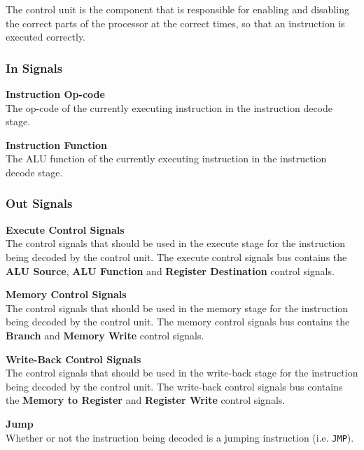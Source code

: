 The control unit is the component that is responsible for enabling and disabling the correct parts of the processor at the correct times, so that an instruction is executed correctly.

\subsubsection{In Signals}

\begin{description}
\item{\textbf{Instruction Op-code}} \\
    The op-code of the currently executing instruction in the instruction decode stage.

\item{\textbf{Instruction Function}} \\
    The ALU function of the currently executing instruction in the instruction decode stage. 
\end{description}

\subsubsection{Out Signals}

\begin{description}
\item{\textbf{Execute Control Signals}} \\
    The control signals that should be used in the execute stage for the instruction being decoded by the control unit.
    The execute control signals bus contains the \textbf{ALU Source}, \textbf{ALU Function} and \textbf{Register Destination} control signals.

\item{\textbf{Memory Control Signals}} \\
    The control signals that should be used in the memory stage for the instruction being decoded by the control unit.
    The memory control signals bus contains the \textbf{Branch} and \textbf{Memory Write} control signals.

\item{\textbf{Write-Back Control Signals}} \\
    The control signals that should be used in the write-back stage for the instruction being decoded by the control unit.
The write-back control signals bus contains the \textbf{Memory to Register} and \textbf{Register Write} control signals.

\item{\textbf{Jump}} \\
    Whether or not the instruction being decoded is a jumping instruction (i.e. \texttt{JMP}).
\end{description}


